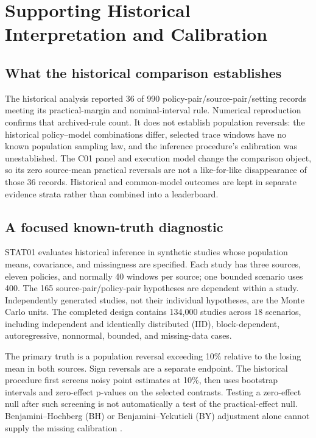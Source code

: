 \section{Supporting Historical Interpretation and Calibration}\label{sec:inference}
\subsection{What the historical comparison establishes}
The historical analysis reported 36 of 990 policy-pair/source-pair/setting
records meeting its practical-margin and nominal-interval rule. Numerical
reproduction confirms that archived-rule count. It does not establish
population reversals: the historical policy--model combinations differ,
selected trace windows have no known population sampling law, and the
inference procedure's calibration was unestablished. The C01 panel and
execution model change the comparison object, so its zero source-mean
practical reversals are not a like-for-like disappearance of those 36
records. Historical and common-model outcomes are kept in separate evidence
strata rather than combined into a leaderboard.

\subsection{A focused known-truth diagnostic}
STAT01 evaluates historical inference in synthetic studies whose population
means, covariance, and missingness are specified. Each study has three
sources, eleven policies, and normally 40 windows per source; one bounded
scenario uses 400. The 165 source-pair/policy-pair hypotheses are dependent
within a study. Independently generated studies, not their individual
hypotheses, are the Monte Carlo units. The completed design contains
134,000 studies across 18 scenarios, including independent and identically distributed (IID), block-dependent,
autoregressive, nonnormal, bounded, and missing-data cases.

The primary truth is a population reversal exceeding 10\% relative to the
losing mean in both sources. Sign reversals are a separate endpoint.
The historical procedure first screens noisy point estimates at 10\%, then
uses bootstrap intervals and zero-effect p-values on the selected contrasts.
Testing a zero-effect null after such screening is not automatically a
test of the practical-effect null. Benjamini--Hochberg (BH) or Benjamini--Yekutieli (BY) adjustment alone cannot supply the missing
calibration \citep{benjamini1995,benjamini2001dependency}.

